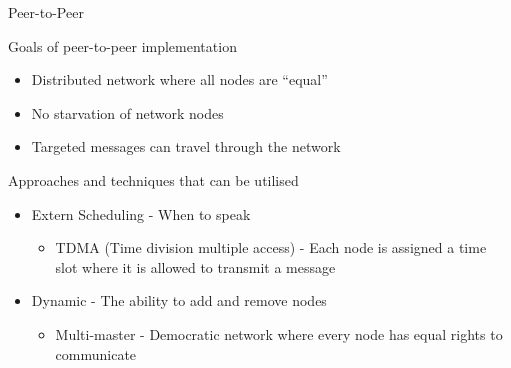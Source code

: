 \begin{frame}{Peer-to-Peer}
	\begin{block}{Goals of peer-to-peer implementation}
		\begin{itemize}
			\item \textcolor{ReneOrange}{Distributed} network where all nodes are ``equal''
			\item No \textcolor{ReneOrange}{starvation} of network nodes
			\item Targeted messages can travel through the network
		\end{itemize}	
	\end{block}
	\begin{block}{Approaches and techniques that can be utilised}
		\begin{itemize}
			\item \textcolor{ReneOrange}{Extern Scheduling} - When to speak
			\begin{itemize}
				\item TDMA (Time division multiple access) - Each node is assigned a time slot where it is allowed to transmit a message				
			\end{itemize}
			\item \textcolor{ReneOrange}{Dynamic} - The ability to add and remove nodes
			\begin{itemize}
				\item \textcolor{ReneOrange}{Multi-master} - Democratic network where every node has equal rights to communicate 
			\end{itemize}		
		\end{itemize}	
	\end{block}	
		
\end{frame}